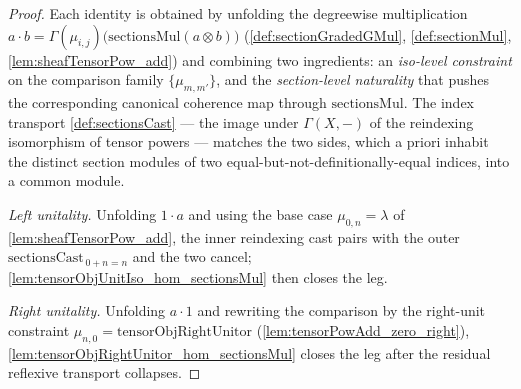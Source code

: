 \begin{proof}  
  Each identity is obtained by unfolding the degreewise multiplication
  \(a \cdot b = \Gamma(\mu_{i,j})\bigl(\mathrm{sectionsMul}(a \otimes b)\bigr)\)
  (\cref{def:sectionGradedGMul}, \cref{def:sectionMul},
  \cref{lem:sheafTensorPow_add}) and combining two ingredients: an
  \emph{iso-level constraint} on the comparison family \(\{\mu_{m,m'}\}\), and the
  \emph{section-level naturality} that pushes the corresponding canonical coherence
  map through \(\mathrm{sectionsMul}\). The index transport \cref{def:sectionsCast}
  --- the image under \(\Gamma(X,-)\) of the reindexing isomorphism of tensor
  powers --- matches the two sides, which a priori inhabit the distinct section
  modules of two equal-but-not-definitionally-equal indices, into a common module.

  \emph{Left unitality.} Unfolding \(1 \cdot a\) and using the base case
  \(\mu_{0,n} = \lambda\) of \cref{lem:sheafTensorPow_add}, the inner reindexing
  cast pairs with the outer \(\mathrm{sectionsCast}_{\,0+n=n}\) and the two cancel;
  \cref{lem:tensorObjUnitIso_hom_sectionsMul} then closes the leg.

  \emph{Right unitality.} Unfolding \(a \cdot 1\) and rewriting the comparison by
  the right-unit constraint \(\mu_{n,0} = \mathrm{tensorObjRightUnitor}\)
  (\cref{lem:tensorPowAdd_zero_right}),
  \cref{lem:tensorObjRightUnitor_hom_sectionsMul} closes the leg after the residual
  reflexive transport collapses.


\end{proof}

